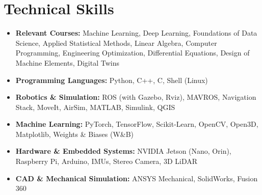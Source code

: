 \documentclass[letterpaper,11pt]{article}
\newcommand{\skillItemListStart}{
  \begin{itemize}[leftmargin=0.10in, label={}, itemsep=2pt, parsep=2pt]\vspace{6pt}
}
\newcommand{\skillItem}[1]{
  \item \small{#1}
}
\newcommand{\skillItemListEnd}{
  \end{itemize}\vspace{-6pt}
}
\begin{document}
\section{Technical Skills}
\skillItemListStart
  \skillItem{
  \textbf{Relevant Courses:} Machine Learning, Deep Learning, Foundations of Data Science, Applied Statistical Methods, Linear Algebra, Computer Programming, Engineering Optimization, Differential Equations, Design of Machine Elements, Digital Twins}
  \skillItem{\textbf{Programming Languages:} Python, C++, C, Shell (Linux)}
  \skillItem{\textbf{Robotics \& Simulation:} ROS (with Gazebo, Rviz), MAVROS, Navigation Stack, MoveIt, AirSim, MATLAB, Simulink, QGIS}
  \skillItem{\textbf{Machine Learning:} PyTorch, TensorFlow, Scikit-Learn, OpenCV, Open3D, Matplotlib, Weights \& Biases (W\&B)}
  \skillItem{\textbf{Hardware \& Embedded Systems:} NVIDIA Jetson (Nano, Orin), Raspberry Pi, Arduino, IMUs, Stereo Camera, 3D LiDAR}
  \skillItem{\textbf{CAD \& Mechanical Simulation:} ANSYS Mechanical, SolidWorks, Fusion 360}
\skillItemListEnd


\end{document}
